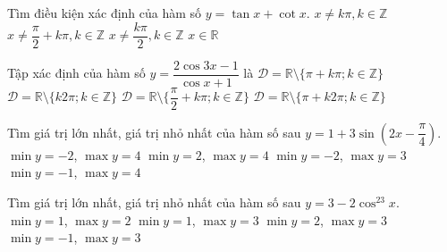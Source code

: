 \begin{ex}%
	Tìm điều kiện xác định của hàm số $ y = \tan x + \cot x $.	
	\choice
	{$ x \neq k \pi, k \in \mathbb{Z} $}
	{$ x \neq \dfrac{\pi}{2} + k \pi, k \in \mathbb{Z} $}
	{\True $ x \neq \dfrac{k \pi}{2}, k \in \mathbb{Z} $}
	{$ x \in \mathbb{R} $}
\end{ex}	

\begin{ex}%
	Tập xác định của hàm số $y=\dfrac{2\cos 3x-1}{\cos x+1}$ là
	\choice
	{$\mathscr{D}=\mathbb{R}\setminus \{\pi+k\pi;k\in\mathbb{Z}\}$}
	{$\mathscr{D}=\mathbb{R}\setminus \{k2\pi;k\in\mathbb{Z}\}$}
	{$\mathscr{D}=\mathbb{R}\setminus \{\dfrac{\pi}{2}+k\pi;k\in\mathbb{Z}\}$}
	{\True $\mathscr{D}=\mathbb{R}\setminus \{\pi+k2\pi;k\in\mathbb{Z}\}$}
\end{ex}

\begin{ex}%
	Tìm giá trị lớn nhất, giá trị nhỏ nhất của hàm số sau $y=1+3\sin\left(2x-\dfrac{\pi}{4}\right)$.
	\choice
	{\True $\min y=-2$, $\max y=4$}
	{$\min y=2$, $\max y=4$}
	{$\min y=-2$, $\max y=3$}
	{$\min y=-1$, $\max y=4$}
\end{ex}

\begin{ex}%
	Tìm giá trị lớn nhất, giá trị nhỏ nhất của hàm số sau $y=3-2\cos^23x$.
	\choice
	{$\min y=1$, $\max y=2$}
	{\True $\min y=1$, $\max y=3$}
	{$\min y=2$, $\max y=3$}
	{$\min y=-1$, $\max y=3$}
\end{ex}


